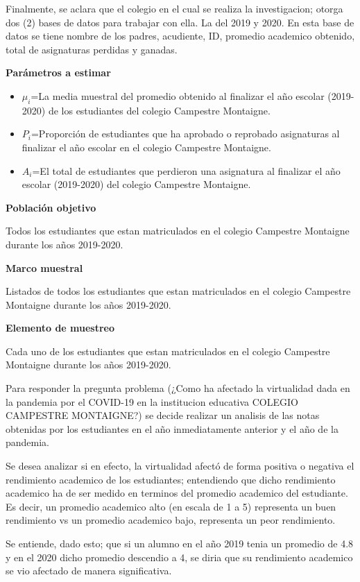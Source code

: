 \documentclass[
]{article}
\providecommand{\tightlist}{%
  \setlength{\itemsep}{0pt}\setlength{\parskip}{0pt}}
\begin{document}
Finalmente, se aclara que el colegio en el cual se realiza la
investigacion; otorga dos (2) bases de datos para trabajar con ella. La
del 2019 y 2020. En esta base de datos se tiene nombre de los padres,
acudiente, ID, promedio academico obtenido, total de asignaturas
perdidas y ganadas.

\textbf{Parámetros a estimar}

\begin{itemize}
\tightlist
\item
  \(\mu_i\)=La media muestral del promedio obtenido al finalizar el año
  escolar (2019-2020) de los estudiantes del colegio Campestre
  Montaigne.
\item
  \(P_i\)=Proporción de estudiantes que ha aprobado o reprobado
  asignaturas al finalizar el año escolar en el colegio Campestre
  Montaigne.
\item
  \(A_i\)=El total de estudiantes que perdieron una asignatura al
  finalizar el año escolar (2019-2020) del colegio Campestre Montaigne.
\end{itemize}

\textbf{Población objetivo}

Todos los estudiantes que estan matriculados en el colegio Campestre
Montaigne durante los años 2019-2020.

\textbf{Marco muestral}

Listados de todos los estudiantes que estan matriculados en el colegio
Campestre Montaigne durante los años 2019-2020.

\textbf{Elemento de muestreo}

Cada uno de los estudiantes que estan matriculados en el colegio
Campestre Montaigne durante los años 2019-2020.

Para responder la pregunta problema (¿Como ha afectado la virtualidad
dada en la pandemia por el COVID-19 en la institucion educativa COLEGIO
CAMPESTRE MONTAIGNE?) se decide realizar un analisis de las notas
obtenidas por los estudiantes en el año inmediatamente anterior y el año
de la pandemia.

Se desea analizar si en efecto, la virtualidad afectó de forma positiva
o negativa el rendimiento academico de los estudiantes; entendiendo que
dicho rendimiento academico ha de ser medido en terminos del promedio
academico del estudiante. Es decir, un promedio academico alto (en
escala de 1 a 5) representa un buen rendimiento vs un promedio academico
bajo, representa un peor rendimiento.

Se entiende, dado esto; que si un alumno en el año 2019 tenia un
promedio de 4.8 y en el 2020 dicho promedio descendio a 4, se diria que
su rendimiento academico se vio afectado de manera significativa.
\end{document}
